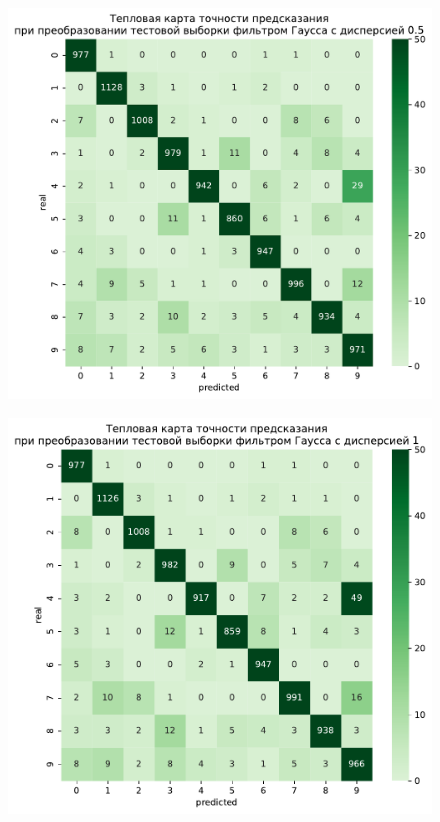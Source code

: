 \documentclass{article}
\begin{document}
\begin{figure}[h]
{\begin{minipage}{8cm}
		\end{minipage}
		\label{app6:goodshift}
	}
	\subfigure
	{
	    \begin{minipage}{8cm}
	        \centering
	        \includegraphics[scale=0.35]{TASK1 test gaus05.pdf}
	    \end{minipage}
	    \label{app6:gauss05}
	}
	\subfigure
	{
		\begin{minipage}{8cm}
			\centering
			\includegraphics[scale=0.35]{TASK1 test gaus1.pdf}

\end{minipage}}
\end{figure}
\end{document}
